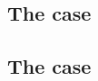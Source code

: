 \subsection{The  case}                            \label{bls: pointevaluation}    
\subsection{The  case}            \label{bls: g1add}               


